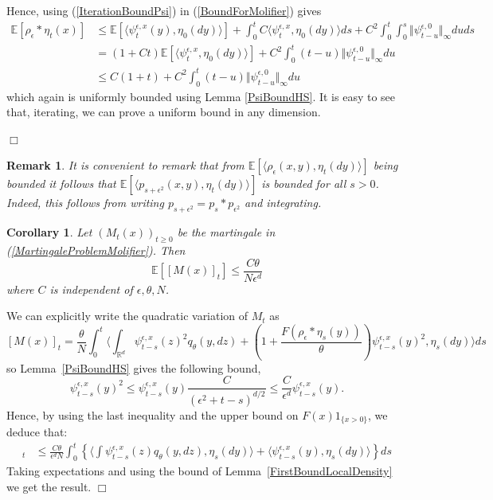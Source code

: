 \documentclass[12pt]{article}
\newenvironment {proof}{{\noindent\bf Proof }}{\hfill $\Box$ \medskip}
\newtheorem{remark}[theorem]{Remark}
\newtheorem{corollary}[theorem]{Corollary}
\newcommand{\IE}{\mathbb E}
\newcommand{\IR}{\mathbb R}
\begin{document}
\begin{proof}
\begin{equation}
\end{equation}
Hence, using (\ref{IterationBoundPsi}) in (\ref{BoundForMolifier}) gives
\begin{align*}
\IE[ \rho_\epsilon * \eta_t(x)  ] &\leq \IE[\langle \psi_t^{\epsilon,x}(y), \eta_0(dy) \rangle] + \int_0^t C\langle \psi_{t}^{\epsilon,x}, \eta_0(dy)\rangle ds + C^2 \int_0^t \int_0^s  \Vert \psi_{t-u}^{\epsilon,0} \Vert_\infty du ds \\ &= (1+Ct) \IE[ \langle \psi_t^{\epsilon,x}, \eta_0(dy) \rangle] + C^2 \int_0^t (t-u) \Vert \psi_{t-u}^{\epsilon,0} \Vert_\infty du \\ &\leq C(1+t) + C^2 \int_0^t (t-u) \Vert \psi_{t-u}^{\epsilon,0} \Vert_\infty du
\end{align*}
which again is uniformly bounded using Lemma \ref{PsiBoundHS}. It is easy to see that, iterating, we can prove a uniform bound in any dimension. 

\end{proof}

\begin{remark} \label{Remark:BoundLocalDensity}
It is convenient to remark that from $\IE\left[ \langle \rho_\epsilon(x,y), \eta_t(dy) \rangle \right]$ being bounded it follows that $\IE[ \langle p_{s+\epsilon^2}(x,y), \eta_t(dy) \rangle ]$ is bounded for all $s>0$. Indeed, this follows from writing $p_{s+\epsilon^2} = p_s * p_{\epsilon^2}$ and integrating.
\end{remark}

\begin{corollary}
Let $(M_t(x))_{t \geq 0}$ be the martingale in (\ref{MartingaleProblemMolifier}). Then
\[ \IE\left[ [M(x)]_t \right] \leq \frac{C \theta}{ N \epsilon^{d}} \]
where $C$ is independent of $\epsilon,\theta,N$. \label{Cor:ControlQVMQ}
\end{corollary}
\begin{proof}
We can explicitly write the quadratic variation of $M_t$ as
\[ [M(x)]_t = \frac{\theta}{N} \int_0^t \langle \int_{\IR^d} \psi_{t-s}^{\epsilon,x}(z)^2 q_\theta(y,dz) + \left(1+\frac{F(\rho_\epsilon * \eta_s(y))}{\theta}\right)\psi_{t-s}^{\epsilon,x}(y)^2, \eta_s(dy) \rangle  ds\]
so Lemma~\ref{PsiBoundHS} gives the following bound,
\[ \psi_{t-s}^{\epsilon,x}(y)^2 \leq \psi_{t-s}^{\epsilon,x}(y) \frac{C}{(\epsilon^2+t-s)^{d/2}} \leq \frac{C}{\epsilon^d} \psi_{t-s}^{\epsilon,x}(y). \]
Hence, by using the last inequality and the upper bound on $F(x)1_{\{x > 0\}}$, we deduce that:
\begin{align}
[M(x)]_t &\leq \frac{C \theta}{\epsilon^d N} \int_0^t \left\{  \langle \int \psi_{t-s}^{\epsilon,x}(z) q_\theta(y,dz), \eta_s(dy) \rangle + \langle \psi_{t-s}^{\epsilon,x}(y), \eta_s(dy)\rangle \right\} ds 
\label{QuadVarBound} \end{align}
Taking expectations and using the bound of Lemma~\ref{FirstBoundLocalDensity} we get the result.
\end{proof}
\end{document}
